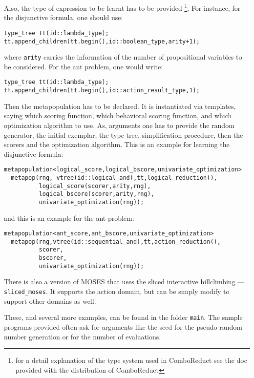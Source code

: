 \documentclass{article}
\begin{document}
Also, the type of expression to be learnt has to be provided 
\footnote{for a detail explanation of the type system used in ComboReduct
  see the doc provided with the distribution of ComboReduct}.
For instance, for the disjunctive formula, one should use:

\begin{verbatim}
type_tree tt(id::lambda_type);
tt.append_children(tt.begin(),id::boolean_type,arity+1);
\end{verbatim}

\noindent 
where \verb|arity| carries the information of the number of 
propositional variables to be considered. For the ant problem, 
one would write: 

\begin{verbatim}
type_tree tt(id::lambda_type);
tt.append_children(tt.begin(),id::action_result_type,1);
\end{verbatim}

Then the metapopulation has to be declared. It is instantiated
via templates, saying which scoring function, which behavioral scoring
function, and which optimization algorithm to use. As, arguments
one has to provide the random generator, the initial exemplar,
the type tree, simplification procedure, then the scorers and
the optimization algorithm. This is an example for learning
the disjunctive formula:

\begin{verbatim}
metapopulation<logical_score,logical_bscore,univariate_optimization> 
  metapop(rng, vtree(id::logical_and),tt,logical_reduction(),
          logical_score(scorer,arity,rng),
          logical_bscore(scorer,arity,rng),
          univariate_optimization(rng));
\end{verbatim}

\noindent 
and this is an example for the ant problem: 

\begin{verbatim}
metapopulation<ant_score,ant_bscore,univariate_optimization> 
  metapop(rng,vtree(id::sequential_and),tt,action_reduction(),
          scorer,
          bscorer,
          univariate_optimization(rng));
\end{verbatim}

There is also a version of MOSES that uses the sliced interactive
hillclimbing --- \verb|sliced_moses|. It supports the action domain,
but can be simply modify to support other domains as well.

These, and several more examples, can be found in the folder \verb|main|.
The sample programs provided often ask for arguments like the seed for
the pseudo-random number generation or for the number of evaluations.
\end{document}
